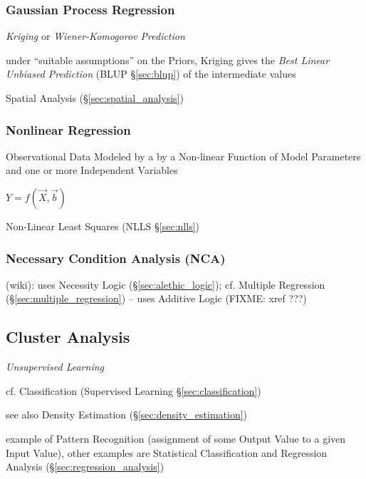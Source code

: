 \subsubsection{Gaussian Process Regression}
\label{sec:gaussian_process_regression}

\emph{Kriging} or \emph{Wiener-Komogorov Prediction}

under ``suitable assumptions'' on the Priors, Kriging gives the \emph{Best
  Linear Unbiased Prediction} (BLUP \S\ref{sec:blup}) of the intermediate values

\fist Spatial Analysis (\S\ref{sec:spatial_analysis})



\subsubsection{Nonlinear Regression}\label{sec:nonlinear_regression}

Observational Data Modeled by a by a Non-linear Function of Model Parameters and
one or more Independent Variables

$Y = f(\vec{X}, \vec{b})$

Non-Linear Least Squares (NLLS \S\ref{sec:nlls})



\subsubsection{Necessary Condition Analysis (NCA)}\label{sec:nca}

(wiki): uses Necessity Logic (\S\ref{sec:alethic_logic});
cf. Multiple Regression (\S\ref{sec:multiple_regression}) -- uses Additive Logic
(FIXME: xref ???)



\subsection{Cluster Analysis}\label{sec:cluster_analysis}

\emph{Unsupervised Learning}

cf. Classification (Supervised Learning \S\ref{sec:classification})

see also Density Estimation (\S\ref{sec:density_estimation})

example of Pattern Recognition (assignment of some Output Value to a given Input
Value), other examples are Statistical Classification and Regression Analysis
(\S\ref{sec:regression_analysis})


